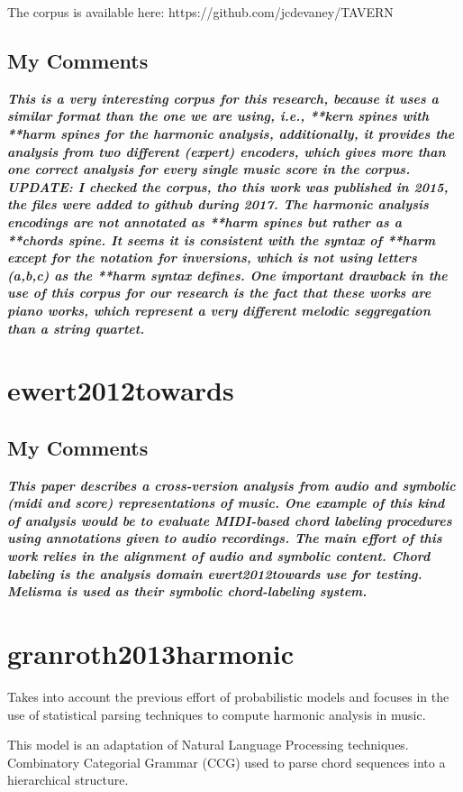 		The corpus is available here: https://github.com/jcdevaney/TAVERN

		\subsection{My Comments}
			\emph{\textbf{
				This is a very interesting corpus for this research, because it uses a similar format than the one we are using, i.e., **kern spines with **harm spines for the harmonic analysis, additionally, it provides the analysis from two different (expert) encoders, which gives more than one correct analysis for every single music score in the corpus. UPDATE: I checked the corpus, tho this work was published in 2015, the files were added to github during 2017. The harmonic analysis encodings are not annotated as **harm spines but rather as a **chords spine. It seems it is consistent with the syntax of **harm except for the notation for inversions, which is not using letters (a,b,c) as the **harm syntax defines. One important drawback in the use of this corpus for our research is the fact that these works are piano works, which represent a very different melodic seggregation than a string quartet.
			}}
	\section{ewert2012towards }
		\subsection{My Comments}
			\emph{\textbf{
				This paper describes a cross-version analysis from audio and symbolic (midi and score) representations of music. One example of this kind of analysis would be to evaluate MIDI-based chord labeling procedures using annotations given to audio recordings. The main effort of this work relies in the alignment of audio and symbolic content. Chord labeling is the analysis domain ewert2012towards use for testing. Melisma is used as their symbolic chord-labeling system.
			}}
	\section{granroth2013harmonic }
		Takes into account the previous effort of probabilistic models and focuses in the use of statistical parsing techniques to compute harmonic analysis in music.

		This model is an adaptation of Natural Language Processing techniques. Combinatory Categorial Grammar (CCG) used to parse chord sequences into a hierarchical structure.

